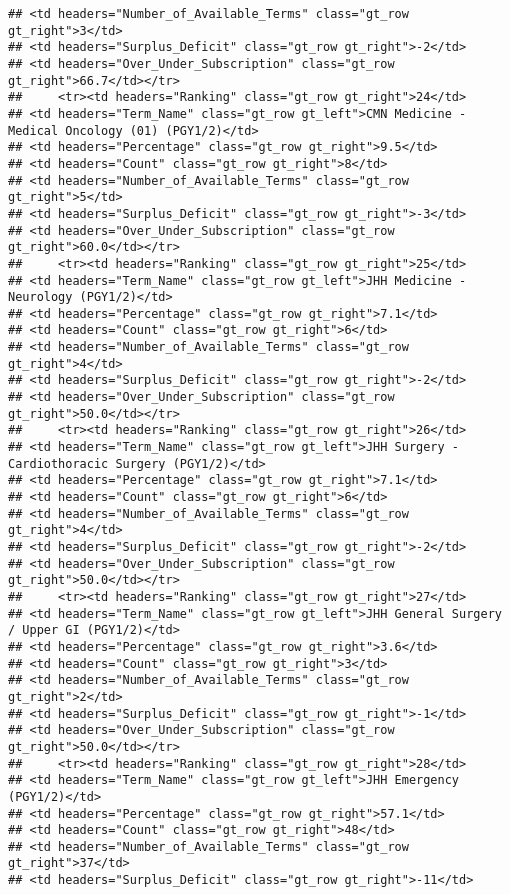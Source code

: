 \documentclass[
]{article}
\begin{document}
\begin{verbatim}
## <td headers="Number_of_Available_Terms" class="gt_row gt_right">3</td>
## <td headers="Surplus_Deficit" class="gt_row gt_right">-2</td>
## <td headers="Over_Under_Subscription" class="gt_row gt_right">66.7</td></tr>
##     <tr><td headers="Ranking" class="gt_row gt_right">24</td>
## <td headers="Term_Name" class="gt_row gt_left">CMN Medicine - Medical Oncology (01) (PGY1/2)</td>
## <td headers="Percentage" class="gt_row gt_right">9.5</td>
## <td headers="Count" class="gt_row gt_right">8</td>
## <td headers="Number_of_Available_Terms" class="gt_row gt_right">5</td>
## <td headers="Surplus_Deficit" class="gt_row gt_right">-3</td>
## <td headers="Over_Under_Subscription" class="gt_row gt_right">60.0</td></tr>
##     <tr><td headers="Ranking" class="gt_row gt_right">25</td>
## <td headers="Term_Name" class="gt_row gt_left">JHH Medicine - Neurology (PGY1/2)</td>
## <td headers="Percentage" class="gt_row gt_right">7.1</td>
## <td headers="Count" class="gt_row gt_right">6</td>
## <td headers="Number_of_Available_Terms" class="gt_row gt_right">4</td>
## <td headers="Surplus_Deficit" class="gt_row gt_right">-2</td>
## <td headers="Over_Under_Subscription" class="gt_row gt_right">50.0</td></tr>
##     <tr><td headers="Ranking" class="gt_row gt_right">26</td>
## <td headers="Term_Name" class="gt_row gt_left">JHH Surgery - Cardiothoracic Surgery (PGY1/2)</td>
## <td headers="Percentage" class="gt_row gt_right">7.1</td>
## <td headers="Count" class="gt_row gt_right">6</td>
## <td headers="Number_of_Available_Terms" class="gt_row gt_right">4</td>
## <td headers="Surplus_Deficit" class="gt_row gt_right">-2</td>
## <td headers="Over_Under_Subscription" class="gt_row gt_right">50.0</td></tr>
##     <tr><td headers="Ranking" class="gt_row gt_right">27</td>
## <td headers="Term_Name" class="gt_row gt_left">JHH General Surgery / Upper GI (PGY1/2)</td>
## <td headers="Percentage" class="gt_row gt_right">3.6</td>
## <td headers="Count" class="gt_row gt_right">3</td>
## <td headers="Number_of_Available_Terms" class="gt_row gt_right">2</td>
## <td headers="Surplus_Deficit" class="gt_row gt_right">-1</td>
## <td headers="Over_Under_Subscription" class="gt_row gt_right">50.0</td></tr>
##     <tr><td headers="Ranking" class="gt_row gt_right">28</td>
## <td headers="Term_Name" class="gt_row gt_left">JHH Emergency (PGY1/2)</td>
## <td headers="Percentage" class="gt_row gt_right">57.1</td>
## <td headers="Count" class="gt_row gt_right">48</td>
## <td headers="Number_of_Available_Terms" class="gt_row gt_right">37</td>
## <td headers="Surplus_Deficit" class="gt_row gt_right">-11</td>

\end{verbatim}
\end{document}
